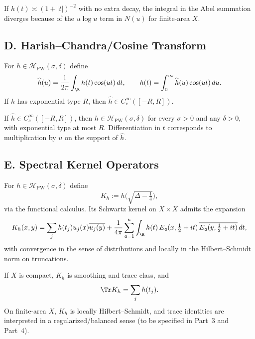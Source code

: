 \begin{remark}
If $h(t)\asymp (1+|t|)^{-2}$ with no extra decay, the integral in the Abel summation diverges because of the $u\log u$ term in $N(u)$ for finite-area $X$.
\end{remark}

\subsection*{D. Harish–Chandra/Cosine Transform}
\label{subsec:hc-transform}

\begin{definition}
\label{def:hc-transform}
For $h\in \mathcal H_{\mathrm{PW}}(\sigma,\delta)$ define
\[
  \widehat h(u)=\frac{1}{2\pi}\int_{\R} h(t)\cos(ut)\,dt,\qquad
  h(t)=\int_{0}^{\infty} \widehat h(u)\cos(ut)\,du.
\]
If $h$ has exponential type $R$, then $\widehat h\in C_c^\infty([-R,R])$.
\end{definition}

\begin{lemma}
\label{lem:hc-properties}
If $\widehat h\in C_c^\infty([-R,R])$, then $h\in \mathcal H_{\mathrm{PW}}(\sigma,\delta)$ for every $\sigma>0$ and any $\delta>0$, with exponential type at most $R$. Differentiation in $t$ corresponds to multiplication by $u$ on the support of $\widehat h$.
\end{lemma}

\subsection*{E. Spectral Kernel Operators}
\label{subsec:spectral-kernels}

\begin{definition}
\label{def:spectral-kernel}
For $h\in \mathcal H_{\mathrm{PW}}(\sigma,\delta)$ define
\[
  K_h := h\!\Big(\sqrt{\Delta-\tfrac14}\Big),
\]
via the functional calculus. Its Schwartz kernel on $X\times X$ admits the expansion
\[
  K_h(x,y)=\sum_j h(t_j)u_j(x)\overline{u_j(y)}+
  \frac{1}{4\pi}\sum_{\mathfrak a=1}^{\kappa}\int_{\R} h(t)\,
  E_{\mathfrak a}(x,\tfrac12+it)\,\overline{E_{\mathfrak a}(y,\tfrac12+it)}\,dt,
\]
with convergence in the sense of distributions and locally in the Hilbert–Schmidt norm on truncations.
\end{definition}

\begin{remark}
If $X$ is compact, $K_h$ is smoothing and trace class, and
\[
  \Tr K_h=\sum_j h(t_j).
\]
On finite-area $X$, $K_h$ is locally Hilbert–Schmidt, and trace identities are interpreted in a regularized/balanced sense (to be specified in Part~3 and Part~4).
\end{remark}

